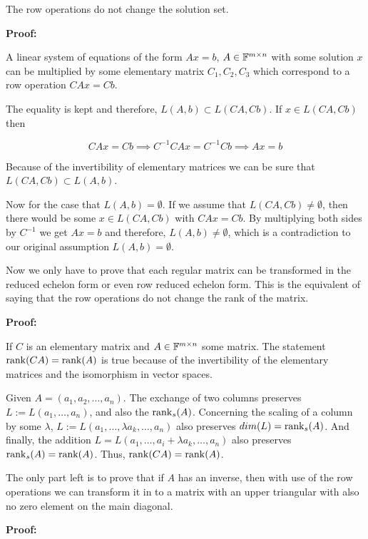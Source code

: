 The row operations do not change the solution set.

\textbf{Proof:}

A linear system of equations of the form \(Ax = b\), \(A \in \mathbb{F}^{m \times n}\) with some solution
\(x\) can be multiplied by some elementary matrix \(C_1, C_2, C_3\) which correspond to a row
operation \(CAx = Cb\).

The equality is kept and therefore, \(L(A,b) \subset L(CA, Cb)\). If \(x \in L(CA, Cb)\) then

\[
    CAx = Cb \implies C^{-1}CAx = C^{-1}Cb \implies Ax = b
\]

Because of the invertibility of elementary matrices we can be sure that  \(L(CA, Cb) \subset L(A,b) \).

Now for the case that \(L(A,b) = \emptyset\). If we assume that \(L(CA,Cb) \ne \emptyset \), then
there would be some \(x \in L(CA,Cb)\) with \(CAx = Cb\). By multiplying both sides by \(C^{-1}\) we
get \(Ax = b\) and therefore, \(L(A, b) \ne \emptyset \), which is a contradiction to our original
assumption \(L(A,b) = \emptyset\).

\QED

Now we only have to prove that each regular matrix can be transformed in the reduced echelon form or
even row reduced echelon form. This is the equivalent of saying that the row operations do not change
the rank of the matrix.

\textbf{Proof:}

If \(C\) is an elementary matrix and \(A \in \mathbb{F}^{m \times n}\) some matrix. The statement \(\mathrm{rank}(CA) = \mathrm{rank}(A)\)
is true because of the invertibility of the elementary matrices and the isomorphism in vector spaces.

Given \(A = (a_1, a_2, \dots, a_n)\). The exchange of two columns preserves \(L := L(a_1, \dots, a_n)\),
and also the \(\mathrm{rank}_s (A)\). Concerning the scaling of a column by some \(\lambda \), \(L := L(a_1, \dots, \lambda a_k, \dots, a_n)\)
also preserves \(dim(L) = \mathrm{rank}_s(A)\). And finally, the addition \(L = L(a_1, \dots, a_i + \lambda a_k, \dots, a_n)\) also preserves
\(\mathrm{rank}_s (A) = \mathrm{rank}(A)\). Thus, \(\mathrm{rank}(CA) = \mathrm{rank}(A)\).

\QED

The only part left is to prove that if \(A\) has an inverse, then with use of the row operations we can
transform it in to a matrix with an upper triangular with also no zero element on the main diagonal.

\textbf{Proof:}

